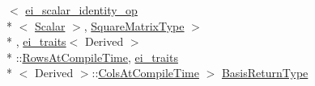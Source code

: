 \begin{DoxyCompactItemize}
$<$ \hyperlink{structei__scalar__identity__op}{ei\-\_\-scalar\-\_\-identity\-\_\-op}\\*
$<$ \hyperlink{class_matrix_base_a625df8339dc2d816cbc0fd66e7dadaf5}{Scalar} $>$, \hyperlink{class_matrix_base_a7f198324e9378d401b50e6aa5fc289ae}{Square\-Matrix\-Type} $>$\\*
, \hyperlink{structei__traits}{ei\-\_\-traits}$<$ Derived $>$\\*
\-::\hyperlink{class_matrix_base_aaa53a8ec1bc1ba52b1e50631dac15d6da10c48c1361376cbd5ef62a18966f2691}{Rows\-At\-Compile\-Time}, \hyperlink{structei__traits}{ei\-\_\-traits}\\*
$<$ Derived $>$\-::\hyperlink{class_matrix_base_aaa53a8ec1bc1ba52b1e50631dac15d6da359babfd1277ae780433d99b383e00e8}{Cols\-At\-Compile\-Time} $>$ \hyperlink{class_matrix_base_a466099fb1cf0970242cbf8011bb1adfd}{Basis\-Return\-Type}
\end{DoxyCompactItemize}
